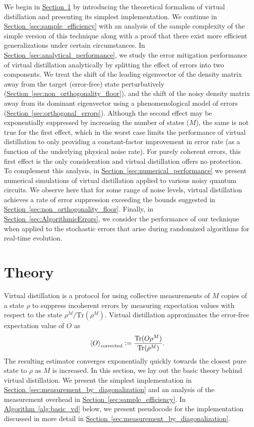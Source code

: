 \documentclass[
amsmath,
amssymb,
aps,
pra,
reprint,
twocolumn,
superscriptaddress,
longbibliography,
showkeys,
floatfix
]{revtex4-1}
\newcommand{\defeq}{\mathrel{\mathop:}=}
\def\tr{\mathrm{Tr}}
\renewcommand{\sec}[1]{\hyperref[sec:#1]{Section~\ref*{sec:#1}}}
\newcommand{\alg}[1]{\hyperref[alg:#1]{Algorithm~\ref*{alg:#1}}}
\begin{document}
We begin in \sec{theory} by introducing the theoretical formalism of virtual
distillation and presenting its simplest implementation.
We continue in \sec{sample_efficiency} with an analysis of the sample complexity
of the simple version of this technique along with a proof that there exist more
efficient generalizations under certain circumstances.
In \sec{analytical_performance}, we study the error mitigation performance of
virtual distillation analytically by splitting the effect of errors into two
components.
We treat the shift of the leading eigenvector of the density matrix away from
the target (error-free) state perturbatively (\sec{non_orthogonality_floor}),
and the shift of the noisy density matrix away from its dominant eigenvector
using a phenomenological model of errors (\sec{orthogonal_errors}).
Although the second effect may be exponentially suppressed by increasing the
number of states ($M$), the same is not true for the first effect, which in the
worst case limits the performance of virtual distillation to only providing a
constant-factor improvement in error rate (as a function of the underlying
physical noise rate). For purely coherent errors, this first effect is the only
consideration and virtual distillation offers no protection.
To complement this analysis, in \sec{numerical_performance} we present numerical
simulations of virtual distillation applied to various noisy quantum circuits.
We observe here that for some range of noise levels, virtual distillation
achieves a rate of error suppression exceeding the bounds suggested in
\sec{non_orthogonality_floor}.
Finally, in \sec{AlgorithmicErrors}, we consider the performance of our technique when
applied to the stochastic errors that arise during randomized algorithms for
real-time evolution.

\section{Theory}\label{sec:theory}


Virtual distillation is a protocol for using collective measurements of \(M\) copies of a state \(\rho\) to suppress incoherent errors by measuring expectation values with respect to the state \(\rho^M / \tr(\rho^M)\).
Virtual distillation approximates the error-free expectation value of \(O\) as
\begin{equation}
  \ev{O}_{\textrm{corrected}} \defeq \frac{\tr(O \rho^M)}{\tr(\rho^M)}.
  \label{eq:O_M_ev}
\end{equation}
The resulting estimator converges exponentially quickly towards the closest pure
state to \(\rho\) as \(M\) is increased.
In this section, we lay out the basic theory behind virtual distillation. 
We present the simplest implementation in \sec{measurement_by_diagonalization}
and an analysis of the measurement overhead in \sec{sample_efficiency}. 
In \alg{basic_vd} below, we present pseudocode for the implementation discussed
in more detail in \sec{measurement_by_diagonalization}.
\end{document}
